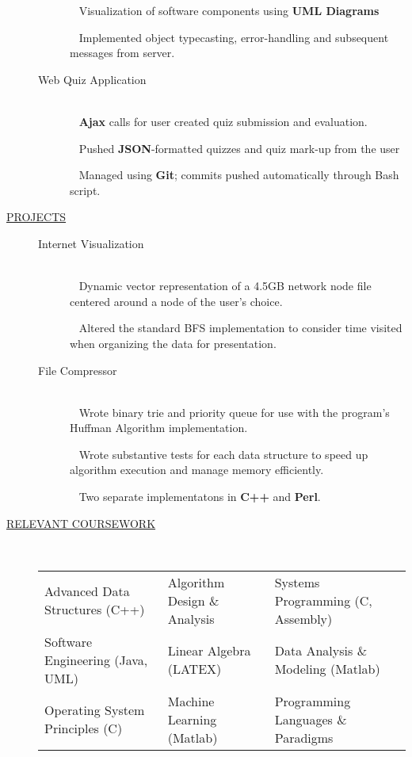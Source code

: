 \documentclass[11pt]{article}
\begin{document}
\begin{description}
\begin{description}
            \textbullet ~ Visualization of software components using {\bf UML Diagrams}

            \textbullet ~ Implemented object typecasting, error-handling and subsequent messages from server.

		\item[Web Quiz Application] \hfill \\
            \textbullet ~ {\bf Ajax} calls for user created quiz submission and evaluation.

            \textbullet ~ Pushed {\bf JSON}-formatted quizzes and quiz mark-up from the user

            \textbullet ~ Managed using {\bf Git}; commits pushed automatically through Bash script.

        \end{description}


    \item[\underline{PROJECTS}] \hfill
        \begin{description}
        \item[Internet Visualization] \hfill \\
		    \textbullet ~ Dynamic vector representation of a 4.5GB network node file centered around a
            node of the user's choice.

            \textbullet ~ Altered the standard BFS implementation to consider time visited when
            organizing the data for presentation.

		\item[File Compressor] \hfill \\
            \textbullet ~ Wrote binary trie and priority queue for use with the program's Huffman Algorithm implementation.

            \textbullet ~ Wrote substantive tests for each data
                structure to speed up algorithm execution and manage memory efficiently.

            \textbullet ~ Two separate implementatons in {\bf C++} and {\bf Perl}.

		\end{description}

    \fi
    \item[\underline{RELEVANT COURSEWORK}]\hfill \\

        \begin{tabular}{l|l|l}
            Advanced Data Structures (C++)& Algorithm Design \& Analysis & Systems Programming (C, Assembly)\\
         Software Engineering (Java, UML) & Linear Algebra (LATEX) &  Data Analysis \& Modeling (Matlab) \\
              Operating System Principles (C) & Machine Learning (Matlab) & Programming Languages \& Paradigms\\
        \end{tabular}


\end{description}
\end{document}

